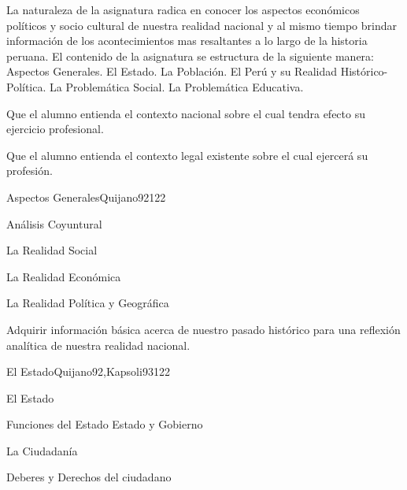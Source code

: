 \begin{syllabus}


\begin{justification}
La naturaleza de la asignatura radica en conocer los aspectos económicos políticos y socio cultural de nuestra realidad nacional y al mismo tiempo brindar información de los acontecimientos mas resaltantes a lo largo de la historia peruana. El contenido de la asignatura se estructura de la siguiente manera: Aspectos Generales. El Estado. La Población. El Perú y su Realidad Histórico-Política. La Problemática Social. La Problemática Educativa.
\end{justification}

\begin{goals}
\item Que el alumno entienda el contexto nacional sobre el cual tendra efecto su ejercicio profesional.
\item Que el alumno entienda el contexto legal existente sobre el cual ejercerá su profesión.
\end{goals}

\begin{outcomes}
\end{outcomes}

\begin{unit}{Aspectos Generales}{Quijano92}{12}{2}
\begin{topics}
	\item Análisis Coyuntural
  	\item La Realidad Social
  	\item La Realidad Económica
  	\item La Realidad Política y Geográfica
\end{topics}

\begin{unitgoals}
      \item  Adquirir información básica acerca de nuestro pasado histórico para una reflexión analítica de nuestra realidad nacional.
   \end{unitgoals}
\end{unit}

\begin{unit}{El Estado}{Quijano92,Kapsoli93}{12}{2}
\begin{topics}
	\item El Estado
	\item Funciones del Estado Estado y Gobierno
	\item La Ciudadanía
	\item Deberes y Derechos del ciudadano
\end{topics}


\end{unit}
\end{syllabus}
